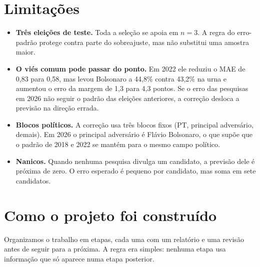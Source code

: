 \documentclass[10.5pt,a4paper]{article}
\begin{document}
\section{Limitações}
\begin{itemize}
\item \textbf{Três eleições de teste.} Toda a seleção se apoia em $n=3$. A regra do erro-padrão protege contra parte do sobreajuste, mas não substitui uma amostra maior.
\item \textbf{O viés comum pode passar do ponto.} Em 2022 ele reduziu o MAE de 0,83 para 0,58, mas levou Bolsonaro a 44,8\% contra 43,2\% na urna e aumentou o erro da margem de 1,3 para 4,3 pontos. Se o erro das pesquisas em 2026 não seguir o padrão das eleições anteriores, a correção desloca a previsão na direção errada.
\item \textbf{Blocos políticos.} A correção usa três blocos fixos (PT, principal adversário, demais). Em 2026 o principal adversário é Flávio Bolsonaro, o que supõe que o padrão de 2018 e 2022 se mantém para o mesmo campo político.
\item \textbf{Nanicos.} Quando nenhuma pesquisa divulga um candidato, a previsão dele é próxima de zero. O erro esperado é pequeno por candidato, mas soma em sete candidatos.
\end{itemize}

\section{Como o projeto foi construído}

Organizamos o trabalho em etapas, cada uma com um relatório e uma revisão antes de seguir para a próxima. A regra era simples: nenhuma etapa usa informação que só aparece numa etapa posterior.
\end{document}
